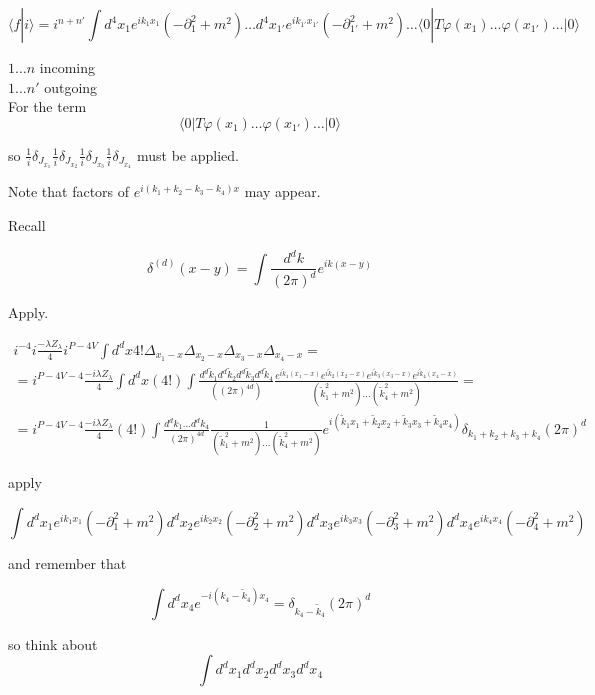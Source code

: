 \documentclass[twoside]{amsart}
\begin{document}
\[
\langle f | i \rangle = i^{n+n'} \int d^4x_1 e^{ik_1x_1}(-\partial_1^2 + m^2 ) \dots d^4x_{1'} e^{ik_{1'}x_{1'}}(-\partial_{1'}^2 + m^2 ) \dots \langle 0 | T\varphi(x_1) \dots \varphi(x_{1'} ) \dots | 0 \rangle
\]

$1\dots n$ incoming \\
$1 \dots n'$ outgoing \\

For the term  
\[
\langle 0 | T\varphi(x_1) \dots \varphi(x_{1'}) \dots | 0 \rangle
\]

so $\frac{1}{i} \delta_{J_{x_1}} \frac{1}{i} \delta_{J_{x_2}} \frac{1}{i} \delta_{J_{x_3}} \frac{1}{i} \delta_{J_{x_4} }$ must be applied.  

Note that factors of $e^{i(k_1 + k_2- k_3 - k_4) x}$ may appear.  

Recall

\[
\delta^{(d)}(x-y) = \int \frac{d^d k}{(2\pi)^d} e^{ik(x-y)}
\]

Apply.  

\[
\begin{gathered}
  i^{-4} i \frac{-\lambda Z_{\lambda}}{4} i^{P - 4V} \int d^dx 4! \Delta_{x_1 - x} \Delta_{x_2 -x} \Delta_{x_3 -x} \Delta_{x_4 - x} =  \\
  = i^{ P - 4V -4 } \frac{ -i \lambda Z_{\lambda }}{ 4} \int d^dx(4!) \int \frac{ d^d \widetilde{k}_1 d^d \widetilde{k}_2 d^d\widetilde{k}_3 d^d\widetilde{k}_4 }{ ( (2\pi)^{4d} ) } \frac{ e^{i \widetilde{k}_1(x_1 -x) } e^{i \widetilde{k}_2(x_2 -x) }e^{i \widetilde{k}_3(x_3 -x) }e^{i \widetilde{k}_4(x_4 -x) } }{ ( \widetilde{k}_1^2 + m^2 ) \dots (\widetilde{k}_4^2 + m^2 ) } = \\ 
 = i^{P-4V -4} \frac{- i \lambda Z_{\lambda }}{ 4 } (4!) \int \frac{ d^dk_1 \dots d^dk_4}{ (2\pi)^{4d} } \frac{1}{ ( \widetilde{k}_1^2 + m^2 ) \dots ( \widetilde{k}_4^2 + m^2 ) } e^{ i ( \widetilde{k}_1 x_1 + \widetilde{k}_2 x_2 + \widetilde{k}_3 x_3 + \widetilde{k}_4 x_4 ) } \delta_{k_1 + k_2 +k_3 + k_4 } (2\pi)^d 
\end{gathered}
\]

apply 

\[
\int d^dx_1 e^{ik_1x_1} (-\partial_1^2 + m^2 ) d^dx_2 e^{ik_2x_2} (-\partial_2^2 + m^2 ) d^dx_3 e^{ik_3x_3} (-\partial_3^2 + m^2 ) d^dx_4 e^{ik_4x_4} (-\partial_4^2 + m^2 ) 
\]

and remember that 

\[
\int d^dx_4 e^{ -i ( k_4 - \widetilde{k}_4 ) x_4 } = \delta_{k_4 - \widetilde{k}_4 } (2\pi)^d
\]

so think about 
\[
\int d^dx_1 d^dx_2 d^dx_3 d^dx_4
\]
\end{document}
